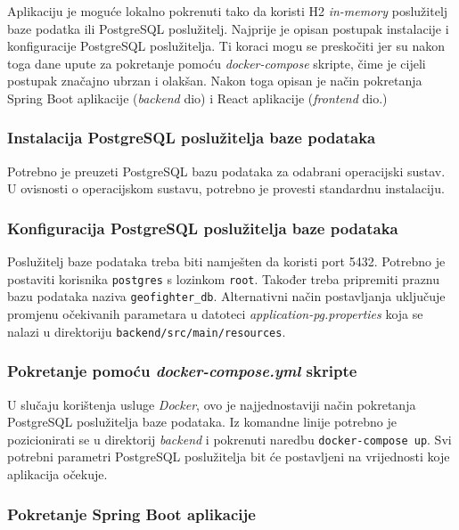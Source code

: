 			{Aplikaciju je moguće lokalno pokrenuti tako da koristi H2 \textit{in-memory} poslužitelj baze podatka ili PostgreSQL poslužitelj. Najprije je opisan postupak instalacije i konfiguracije PostgreSQL poslužitelja. Ti koraci mogu se preskočiti jer su nakon toga dane upute za pokretanje pomoću \textit{docker-compose} skripte, čime je cijeli postupak značajno ubrzan i olakšan. Nakon toga opisan je način pokretanja Spring Boot aplikacije (\textit{backend} dio) i React aplikacije (\textit{frontend} dio.)}
			
			\subsubsection{Instalacija PostgreSQL poslužitelja baze podataka}
		
			 {Potrebno je preuzeti PostgreSQL bazu podataka za odabrani operacijski sustav. U ovisnosti o operacijskom sustavu, potrebno je provesti standardnu instalaciju.}
			 
 			\subsubsection{Konfiguracija PostgreSQL poslužitelja baze podataka}
			 
			 {Poslužitelj baze podataka treba biti namješten da koristi port 5432. Potrebno je postaviti korisnika \texttt{postgres} s lozinkom \texttt{root}. Također treba pripremiti praznu bazu podataka naziva \texttt{geofighter\_db}. Alternativni način postavljanja uključuje promjenu očekivanih parametara u datoteci \textit{application-pg.properties} koja se nalazi u direktoriju \texttt{backend/src/main/resources}.}
			
 			\subsubsection{Pokretanje pomoću \textit{docker-compose.yml} skripte}
			
			{U slučaju korištenja usluge \textit{Docker}, ovo je najjednostaviji način pokretanja PostgreSQL poslužitelja baze podataka. Iz komandne linije potrebno je pozicionirati se u direktorij \textit{backend} i pokrenuti naredbu \texttt{docker-compose up}. Svi potrebni parametri PostgreSQL poslužitelja bit će postavljeni na vrijednosti koje aplikacija očekuje.}
			
 			\subsubsection{Pokretanje Spring Boot aplikacije}
			
